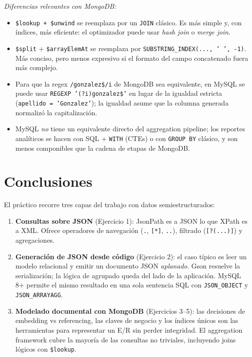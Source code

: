 \documentclass[11pt,a4paper]{article}
\begin{document}
\textit{Diferencias relevantes con MongoDB:}

\begin{itemize}
    \item \texttt{\$lookup + \$unwind} se reemplaza por un \texttt{JOIN} clásico. Es más simple y, con índices, más eficiente: el optimizador puede usar \emph{hash join} o \emph{merge join}.
    \item \texttt{\$split} + \texttt{\$arrayElemAt} se reemplaza por \texttt{SUBSTRING\_INDEX(..., ' ', -1)}. Más conciso, pero menos expresivo si el formato del campo concatenado fuera más complejo.
    \item Para que la regex \texttt{/gonzalez\$/i} de MongoDB sea equivalente, en MySQL se puede usar \texttt{REGEXP '(?i)gonzalez\$'} en lugar de la igualdad estricta (\texttt{apellido = 'Gonzalez'}); la igualdad asume que la columna generada normalizó la capitalización.
    \item MySQL \emph{no} tiene un equivalente directo del aggregation pipeline; los reportes analíticos se hacen con SQL + \texttt{WITH} (CTEs) o con \texttt{GROUP BY} clásico, y son menos componibles que la cadena de etapas de MongoDB.
\end{itemize}

\section*{Conclusiones}

El práctico recorre tres capas del trabajo con datos semiestructurados:

\begin{enumerate}
    \item \textbf{Consultas sobre JSON} (Ejercicio 1): JsonPath es a JSON lo que XPath es a XML. Ofrece operadores de navegación (\texttt{.}, \texttt{[*]}, \texttt{..}), filtrado (\texttt{[?(...)]}) y agregaciones.
    \item \textbf{Generación de JSON desde código} (Ejercicio 2): el caso típico es leer un modelo relacional y emitir un documento JSON \emph{aplanado}. Gson resuelve la serialización; la lógica de agrupado queda del lado de la aplicación. MySQL 8+ permite el mismo resultado en una sola sentencia SQL con \texttt{JSON\_OBJECT} y \texttt{JSON\_ARRAYAGG}.
    \item \textbf{Modelado documental con MongoDB} (Ejercicios 3--5): las decisiones de embedding vs referencing, las claves de negocio y los índices únicos son las herramientas para representar un E/R sin perder integridad. El aggregation framework cubre la mayoría de las consultas no triviales, incluyendo joins lógicos con \texttt{\$lookup}.
\end{enumerate}
\end{document}
